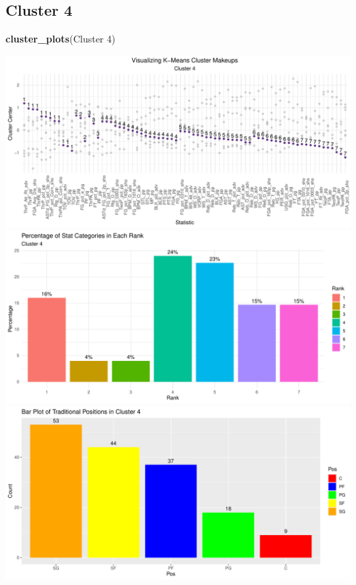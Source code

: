 \documentclass[
]{article}
\newenvironment{Shaded}{\begin{snugshade}}{\end{snugshade}}
\newcommand{\FunctionTok}[1]{\textcolor[rgb]{0.13,0.29,0.53}{\textbf{#1}}}
\newcommand{\NormalTok}[1]{#1}
\newcommand{\StringTok}[1]{\textcolor[rgb]{0.31,0.60,0.02}{#1}}
\begin{document}
\hypertarget{cluster-4}{%
\subsection{Cluster 4}\label{cluster-4}}

\begin{Shaded}
\begin{Highlighting}[]
\FunctionTok{cluster\_plots}\NormalTok{(}\StringTok{\textquotesingle{}Cluster 4\textquotesingle{}}\NormalTok{)}
\end{Highlighting}
\end{Shaded}

\includegraphics{Reclassifying-NBA-Player-Postions-Pt.-3---Clustering-Analysis-Results_files/figure-latex/unnamed-chunk-5-1.pdf}
\includegraphics{Reclassifying-NBA-Player-Postions-Pt.-3---Clustering-Analysis-Results_files/figure-latex/unnamed-chunk-5-2.pdf}
\includegraphics{Reclassifying-NBA-Player-Postions-Pt.-3---Clustering-Analysis-Results_files/figure-latex/unnamed-chunk-5-3.pdf}
\end{document}
